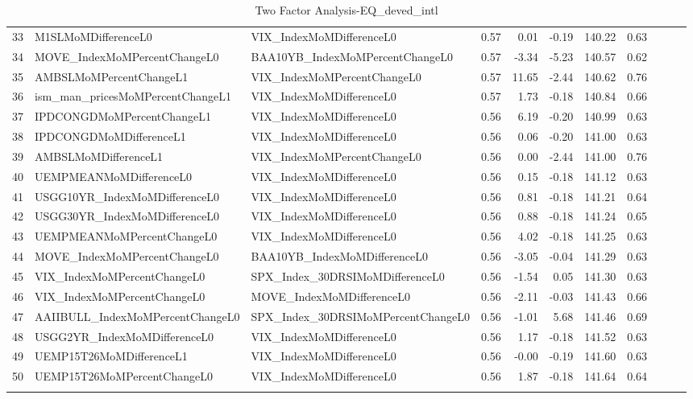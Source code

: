 \begin{longtable}{rllrrrrrlll}
  33 & M1SLMoMDifferenceL0 & VIX\_IndexMoMDifferenceL0 & 0.57 & 0.01 & -0.19 & 140.22 & 0.63 &  &  &  \\ 
  34 & MOVE\_IndexMoMPercentChangeL0 & BAA10YB\_IndexMoMPercentChangeL0 & 0.57 & -3.34 & -5.23 & 140.57 & 0.62 &  &  &  \\ 
  35 & AMBSLMoMPercentChangeL1 & VIX\_IndexMoMPercentChangeL0 & 0.57 & 11.65 & -2.44 & 140.62 & 0.76 &  &  &  \\ 
  36 & ism\_man\_pricesMoMPercentChangeL1 & VIX\_IndexMoMDifferenceL0 & 0.57 & 1.73 & -0.18 & 140.84 & 0.66 &  &  &  \\ 
  37 & IPDCONGDMoMPercentChangeL1 & VIX\_IndexMoMDifferenceL0 & 0.56 & 6.19 & -0.20 & 140.99 & 0.63 &  &  &  \\ 
  38 & IPDCONGDMoMDifferenceL1 & VIX\_IndexMoMDifferenceL0 & 0.56 & 0.06 & -0.20 & 141.00 & 0.63 &  &  &  \\ 
  39 & AMBSLMoMDifferenceL1 & VIX\_IndexMoMPercentChangeL0 & 0.56 & 0.00 & -2.44 & 141.00 & 0.76 &  &  &  \\ 
  40 & UEMPMEANMoMDifferenceL0 & VIX\_IndexMoMDifferenceL0 & 0.56 & 0.15 & -0.18 & 141.12 & 0.63 &  &  &  \\ 
  41 & USGG10YR\_IndexMoMDifferenceL0 & VIX\_IndexMoMDifferenceL0 & 0.56 & 0.81 & -0.18 & 141.21 & 0.64 &  &  &  \\ 
  42 & USGG30YR\_IndexMoMDifferenceL0 & VIX\_IndexMoMDifferenceL0 & 0.56 & 0.88 & -0.18 & 141.24 & 0.65 &  &  &  \\ 
  43 & UEMPMEANMoMPercentChangeL0 & VIX\_IndexMoMDifferenceL0 & 0.56 & 4.02 & -0.18 & 141.25 & 0.63 &  &  &  \\ 
  44 & MOVE\_IndexMoMPercentChangeL0 & BAA10YB\_IndexMoMDifferenceL0 & 0.56 & -3.05 & -0.04 & 141.29 & 0.63 &  &  &  \\ 
  45 & VIX\_IndexMoMPercentChangeL0 & SPX\_Index\_30DRSIMoMDifferenceL0 & 0.56 & -1.54 & 0.05 & 141.30 & 0.63 &  &  &  \\ 
  46 & VIX\_IndexMoMPercentChangeL0 & MOVE\_IndexMoMDifferenceL0 & 0.56 & -2.11 & -0.03 & 141.43 & 0.66 &  &  &  \\ 
  47 & AAIIBULL\_IndexMoMPercentChangeL0 & SPX\_Index\_30DRSIMoMPercentChangeL0 & 0.56 & -1.01 & 5.68 & 141.46 & 0.69 &  &  &  \\ 
  48 & USGG2YR\_IndexMoMDifferenceL0 & VIX\_IndexMoMDifferenceL0 & 0.56 & 1.17 & -0.18 & 141.52 & 0.63 &  &  &  \\ 
  49 & UEMP15T26MoMDifferenceL1 & VIX\_IndexMoMDifferenceL0 & 0.56 & -0.00 & -0.19 & 141.60 & 0.63 &  &  &  \\ 
  50 & UEMP15T26MoMPercentChangeL0 & VIX\_IndexMoMDifferenceL0 & 0.56 & 1.87 & -0.18 & 141.64 & 0.64 &  &  &  \\ 
   \hline
\hline
\caption{Two Factor Analysis-EQ_deved_intl} 
\end{longtable}
